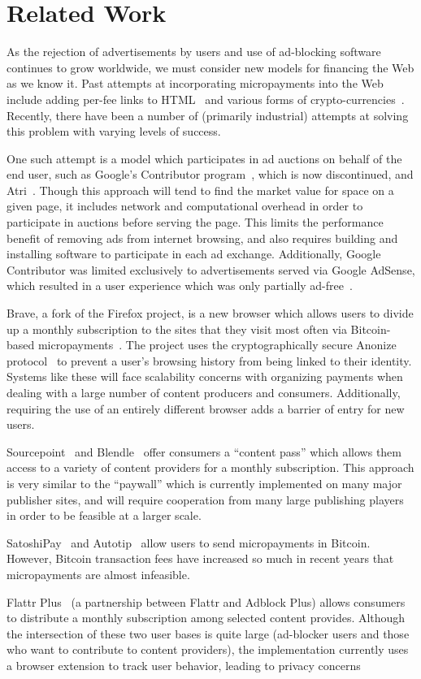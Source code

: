\section{Related Work}
As the rejection of advertisements by users and use of ad-blocking
software continues to grow worldwide, we must consider new models for
financing the Web as we know it. Past attempts at incorporating
micropayments into the Web include adding per-fee links to
HTML~\cite{w3c} and various forms of
crypto-currencies~\cite{peppercoin}. Recently, there have been a
number of (primarily industrial) attempts at solving this problem with
varying levels of success.

One such attempt is a model which participates in ad auctions on
behalf of the end user, such as Google's Contributor
program~\cite{contributor}, which is now discontinued, and
Atri~\cite{atri}. Though this approach will tend to find the market
value for space on a given page, it includes network and computational
overhead in order to participate in auctions before serving the
page. This limits the performance benefit of removing ads from
internet browsing, and also requires building and installing software
to participate in each ad exchange. Additionally, Google Contributor
was limited exclusively to advertisements served via Google AdSense,
which resulted in a user experience which was only partially
ad-free~\cite{adsense}.

Brave, a fork of the Firefox project, is a new browser which allows
users to divide up a monthly subscription to the sites that they visit
most often via Bitcoin-based micropayments~\cite{brave}. The project
uses the cryptographically secure Anonize protocol~\cite{anonize} to
prevent a user's browsing history from being linked to their
identity. Systems like these will face scalability concerns with
organizing payments when dealing with a large number of content
producers and consumers. Additionally, requiring the use of an
entirely different browser adds a barrier of entry for new users.

Sourcepoint~\cite{sourcepoint} and Blendle~\cite{blendle} offer consumers a
“content pass” which allows them access to a variety of content
providers for a monthly subscription. This approach is very similar to
the “paywall” which is currently implemented on many major publisher
sites, and will require cooperation from many large publishing players
in order to be feasible at a larger scale.

SatoshiPay~\cite{satoshi} and Autotip~\cite{autotip} allow users to
send micropayments in Bitcoin. However, Bitcoin transaction fees have
increased so much in recent years that micropayments are almost
infeasible.

Flattr Plus~\cite{flattrplus} (a partnership between Flattr and
Adblock Plus) allows consumers to distribute a monthly subscription
among selected content provides. Although the intersection of these
two user bases is quite large (ad-blocker users and those who want to
contribute to content providers), the implementation currently uses a
browser extension to track user behavior, leading to privacy concerns
